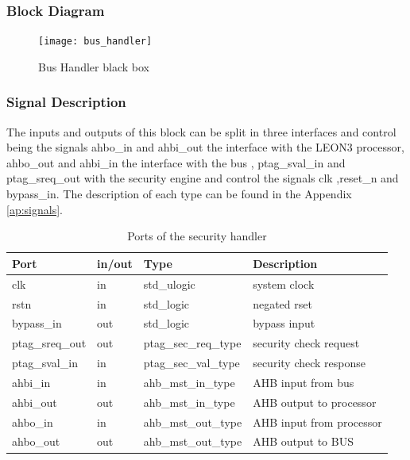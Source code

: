 \subsubsection{Block Diagram}

\begin{figure}[!ht]
	\centering
	\texttt{[image: bus\_handler]}
    \caption{Bus Handler  black box  }
	\label{fig:bhbb}
\end{figure}


\subsubsection{Signal Description}

The inputs and outputs of this block can be split in three interfaces and control being
the signals  ahbo\_in and ahbi\_out the interface with the LEON3 processor,  ahbo\_out  and ahbi\_in
the interface with the bus , ptag\_sval\_in and ptag\_sreq\_out with the security engine  and control
 the signals clk ,reset\_n and bypass\_in.
 The description of each type can be found in the Appendix \ref{ap:signals}.
\begin{table}[H]
\centering
\label{table:shports}
\begin{tabular}{l l l l}
\textbf{Port}   & \textbf{in/out} & \textbf{Type}        & \textbf{Description} 	\\ \hline \hline
clk             & in              & std\_ulogic          & system clock         	\\ \hline
rstn            & in              & std\_logic           & negated rset         	\\ \hline
bypass\_in      & out             & std\_logic           & bypass input         	\\ \hline
ptag\_sreq\_out & out             & ptag\_sec\_req\_type & security check request    	\\ \hline
ptag\_sval\_in  & in              & ptag\_sec\_val\_type & security check response  	\\ \hline
ahbi\_in        & in              & ahb\_mst\_in\_type   & AHB input from bus      	\\ \hline
ahbi\_out       & out             & ahb\_mst\_in\_type   & AHB output to processor      \\ \hline
ahbo\_in        & in              & ahb\_mst\_out\_type  & AHB input from processor    \\ \hline
ahbo\_out       & out             & ahb\_mst\_out\_type  & AHB output to BUS            \\ \hline
\end{tabular}
 \caption{Ports of the security handler}
\end{table}





